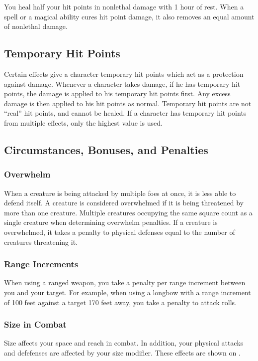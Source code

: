 You heal half your hit points in nonlethal damage with 1 hour of rest. When a spell or a magical ability cures hit point damage, it also removes an equal amount of nonlethal damage.

\subsection{Temporary Hit Points}\label{Temporary Hit Points}
Certain effects give a character temporary hit points which act as a protection against damage. Whenever a character takes damage, if he has temporary hit points, the damage is applied to his temporary hit points first. Any excess damage is then applied to his hit points as normal. Temporary hit points are not ``real'' hit points, and cannot be healed. If a character has temporary hit points from multiple effects, only the highest value is used.

\subsection{Circumstances, Bonuses, and Penalties}

\subsubsection{Overwhelm}\label{Overwhelm}
When a creature is being attacked by multiple foes at once, it is less able to defend itself. A creature is considered overwhelmed if it is being threatened by more than one creature. Multiple creatures occupying the same square count as a single creature when determining overwhelm penalties. If a creature is overwhelmed, it takes a penalty to physical defenses equal to the number of creatures threatening it.

\subsubsection{Range Increments}
When using a ranged weapon, you take a  penalty per range increment between you and your target. For example, when using a longbow with a range increment of 100 feet against a target 170 feet away, you take a  penalty to attack rolls.

\subsubsection{Size in Combat}\label{Size in Combat}
Size affects your space and reach in combat. In addition, your physical attacks and defefenses are affected by your size modifier. These effects are shown on . 

